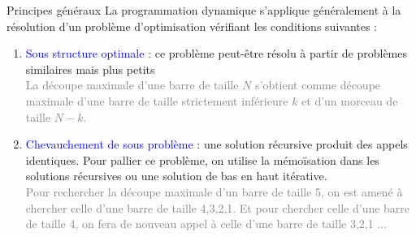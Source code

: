\documentclass[10pt]{beamer}
\begin{document}
\begin{frame}{\Ctitle}{\stitle}
	\begin{alertblock}{Principes généraux}
		La programmation dynamique s'applique généralement à la résolution d'un problème d'optimisation vérifiant les conditions suivantes :
		\begin{enumerate}
			\item<2-> \textcolor{blue}{Sous structure optimale} : ce problème peut-être résolu à partir de problèmes similaires mais plus petits \\
				\onslide<3->\textcolor{gray}{\small La découpe maximale d'une barre de taille $N$ s'obtient comme découpe maximale  d'une barre de taille strictement inférieure $k$ et d'un morceau de taille $N-k$.}
				\item<4->\textcolor{blue}{Chevauchement de sous problème} : une solution récursive produit des appels identiques. Pour pallier ce problème, on utilise la mémoïsation dans les solutions récursives ou une solution de bas en haut itérative.\\
				\onslide<5->\textcolor{gray}{\small Pour rechercher la découpe maximale d'un barre de taille 5, on est amené à chercher celle d'une barre de taille 4,3,2,1. Et pour chercher celle d'une barre de taille 4, on fera de nouveau appel à celle d'une barre de taille 3,2,1 ...}
		\end{enumerate}
	\end{alertblock}
\end{frame}
\end{document}
